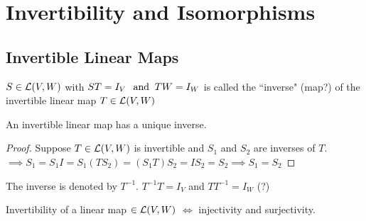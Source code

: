 \section{Invertibility and Isomorphisms}

\subsection{Invertible Linear Maps}
  \setcounter{thm}{58}
  \begin{mydef}
    $S\in {\mathcal{L}(V,W)}$ with $ST=I_V \;\;\, \text{and}\;\; TW = I_W$ is called the ``inverse" (map?) of the invertible linear map $T \in {\mathcal{L}(V,W)}$
  \end{mydef}

  \begin{thm}
    An invertible  linear map has a unique inverse.
  \end{thm}
  \begin{proof}
    Suppose $T\in {\mathcal{L}(V,W)}$ is invertible and $S_1$ and $S_2$ are inverses of $T$. $\implies S_1 = S_1 I = S_1 (T S_2) = (S_1 T) S_2 = I S_2 = S_2 \implies S_1 = S_2$
  \end{proof}

  \begin{thm}
    The inverse is denoted by $T^{-1}$. $T^{-1}T=I_V$ and $T T^{-1} = I_W$ (?)
  \end{thm}

  \begin{thm}
    Invertibility of a linear map $\in {\mathcal{L}(V,W)}$ $\iff$ injectivity and surjectivity.
  \end{thm}

